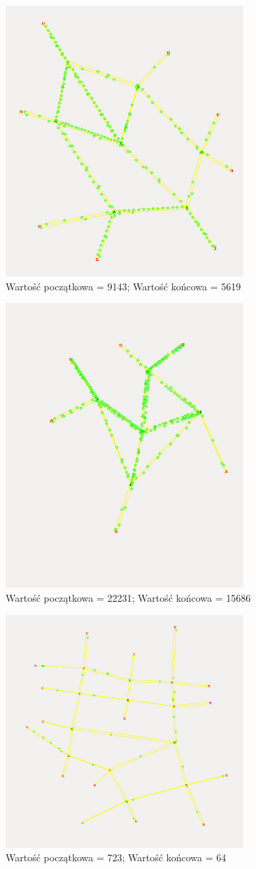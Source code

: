 \documentclass{article}
\begin{document}
\begin{figure}[ht!]
\centering
\includegraphics[width=90mm]{map1.jpg}
\caption{Wartość początkowa = 9143; Wartość końcowa = 5619}
\label{overflow}
\end{figure}


\begin{figure}[ht!]
\centering
\includegraphics[width=90mm]{map2.jpg}
\caption{Wartość początkowa = 22231; Wartość końcowa = 15686 }
\label{overflow}
\end{figure}

\begin{figure}[ht!]
\centering
\includegraphics[width=90mm]{map3.jpg}
\caption{Wartość początkowa = 723; Wartość końcowa = 64}
\label{overflow}
\end{figure}
\end{document}
